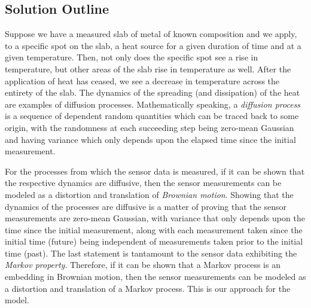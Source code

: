 \documentclass[11pt]{imsart}
\begin{document}
\subsection{Solution Outline}
\label{psolution}

Suppose we have a measured slab of metal of known composition and we apply, to a specific spot on the slab, a heat source for a given duration of time and at a given temperature.  Then, not only does the specific spot see a rise in temperature, but other areas of the slab rise in temperature as well.   After the application of heat has ceased, we see a decrease in temperature across the entirety of the slab.  The dynamics of the spreading (and dissipation) of the heat are examples of diffusion processes.  Mathematically speaking, a \textit{diffusion process} is a sequence of dependent random quantities which can be traced back to some origin, with the randomness at each succeeding step being zero-mean Gaussian and having variance which only depends upon the elapsed time since the initial measurement.

For the processes from which the sensor data is measured, if it can be shown that the respective dynamics are diffusive, then the sensor measurements can be modeled as a distortion and translation of \textit{Brownian motion}.  Showing that the dynamics of the processes are diffusive is a matter of proving that the sensor measurements are zero-mean Gaussian, with variance that only depends upon the time since the initial measurement, along with each measurement taken since the initial time (future) being independent of measurements taken prior to the initial time (past).  The last statement is tantamount to the sensor data exhibiting the \textit{Markov property}.  Therefore, if it can be shown that a Markov process is an embedding in Brownian motion, then the sensor measurements can be modeled as a distortion and translation of a Markov process.  This is our approach for the model.\\
\end{document}
